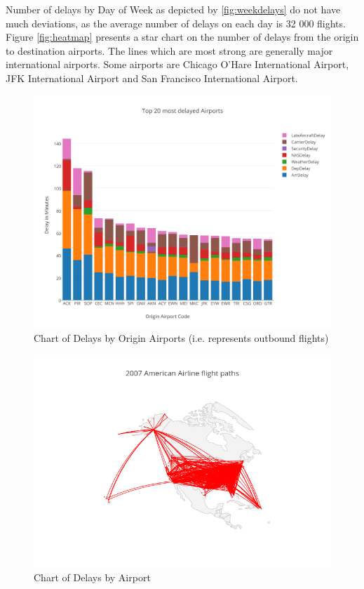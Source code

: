 \documentclass[letterpaper,11pt]{article}
\begin{document}
Number of delays by Day of Week as depicted by \ref{fig:weekdelays} do not have much deviations, as the average number of delays on each day is 32 000 flights. Figure \ref{fig:heatmap} presents a star chart on the number of delays from the origin to destination airports. The lines which are most strong are generally major international airports. Some airports are Chicago O'Hare International Airport, JFK International Airport and San Francisco International Airport. 

\begin{figure}[htb]
\centering
\includegraphics[width=1.1\linewidth]{delaybyorigin.png}
\caption{Chart of Delays by Origin Airports (i.e. represents outbound flights)}
\label{fig:delaybyorigin}
\end{figure}

\begin{figure}[htb]
\centering
\includegraphics[width=1.1\linewidth]{airportpaths.png}
\caption{Chart of Delays by Airport}
\label{fig:flightroutes}
\end{figure}
\end{document}

